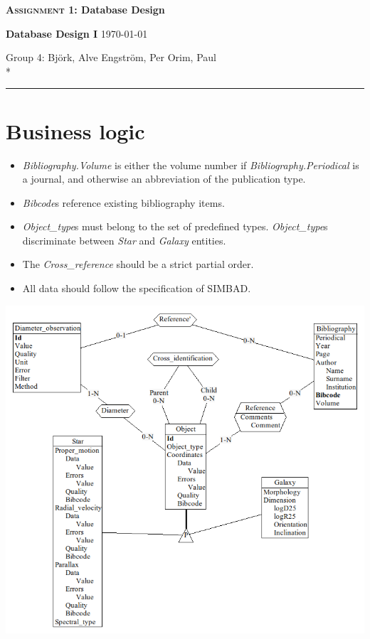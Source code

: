 \documentclass[a4paper, pagesize, parskip=half]{scrartcl}
\begin{document}
\Huge \textbf{\textsc{Assignment 1}: Database Design}

\Large \textbf{Database Design I} \quad \large \today

\normalsize Group 4: \quad Björk, Alve  \quad Engström, Per \quad Orim, Paul \\*
\rule{\textwidth}{1pt}

\bigskip

\section*{Business logic}

\begin{itemize}
    \item \emph{Bibliography.Volume} is either the volume number if \emph{Bibliography.Periodical} is a journal, and otherwise an abbreviation of the publication type.
    
    \item \emph{Bibcode}s reference existing bibliography items.
    
    \item \emph{Object\_type}s must belong to the set of predefined types. \emph{Object\_type}s discriminate between \emph{Star} and \emph{Galaxy} entities.
    
    \item The \emph{Cross\_reference} should be a strict partial order.
    
    \item All data should follow the specification of SIMBAD.
\end{itemize}

\includegraphics[width=\textwidth]{diagram.png}
\end{document}
